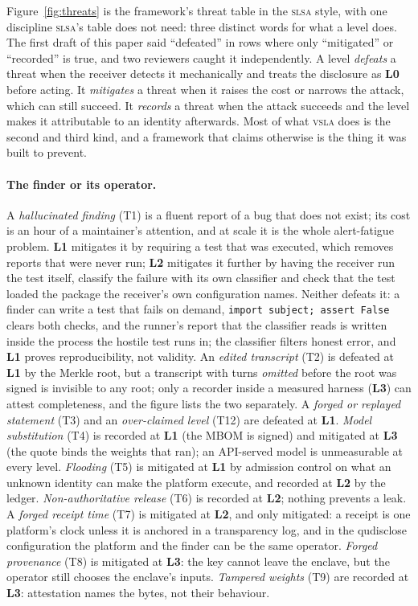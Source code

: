 \documentclass[11pt]{article}
\newcommand{\vsla}{\textsc{vsla}}
\newcommand{\slsa}{\textsc{slsa}}
\newcommand{\lvl}[1]{\textbf{L#1}}
\begin{document}
Figure~\ref{fig:threats} is the framework's threat table in the \slsa{} style, with one discipline \slsa{}'s table
does not need: three distinct words for what a level does. The first draft of this paper said ``defeated'' in
rows where only ``mitigated'' or ``recorded'' is true, and two reviewers caught it independently. A level
\emph{defeats} a threat when the receiver detects it mechanically and treats the disclosure as \lvl{0} before
acting. It \emph{mitigates} a threat when it raises the cost or narrows the attack, which can still succeed. It
\emph{records} a threat when the attack succeeds and the level makes it attributable to an identity afterwards.
Most of what \vsla{} does is the second and third kind, and a framework that claims otherwise is the thing it
was built to prevent.

\paragraph{The finder or its operator.} A \emph{hallucinated finding} (T1) is a fluent report of a bug that
does not exist; its cost is an hour of a maintainer's attention, and at scale it is the whole alert-fatigue
problem. \lvl{1} mitigates it by requiring a test that was executed, which removes reports that were never run;
\lvl{2} mitigates it further by having the receiver run the test itself, classify the failure with its own
classifier and check that the test loaded the package the receiver's own configuration names. Neither defeats it:
a finder can write a test that fails on demand, \texttt{import subject; assert False} clears both checks, and the
runner's report that the classifier reads is written inside the process the hostile test runs in; the classifier
filters honest error, and \lvl{1} proves reproducibility, not validity. An \emph{edited transcript} (T2)
is defeated at \lvl{1} by the Merkle root, but a transcript with turns \emph{omitted} before the root was signed
is invisible to any root; only a recorder inside a measured harness (\lvl{3}) can attest completeness, and the
figure lists the two separately. A \emph{forged or replayed statement} (T3) and an \emph{over-claimed level}
(T12) are defeated at \lvl{1}. \emph{Model substitution} (T4) is recorded at \lvl{1} (the MBOM is signed) and
mitigated at \lvl{3} (the quote binds the weights that ran); an API-served model is unmeasurable at every level.
\emph{Flooding} (T5) is mitigated at \lvl{1} by admission control on what an unknown identity can make the
platform execute, and recorded at \lvl{2} by the ledger. \emph{Non-authoritative release} (T6) is recorded at
\lvl{2}; nothing prevents a leak. A \emph{forged receipt time} (T7) is mitigated at \lvl{2}, and only mitigated:
a receipt is one platform's clock unless it is anchored in a transparency log, and in the qudisclose
configuration the platform and the finder can be the same operator. \emph{Forged provenance} (T8) is mitigated at
\lvl{3}: the key cannot leave the enclave, but the operator still chooses the enclave's inputs. \emph{Tampered
weights} (T9) are recorded at \lvl{3}: attestation names the bytes, not their behaviour.
\end{document}
